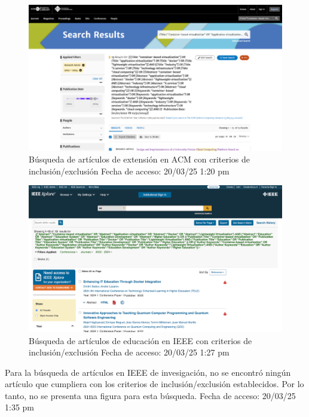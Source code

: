\begin{figure}[htbp]
    \centering
    \includegraphics[width=\textwidth,keepaspectratio]{apendices/BD/criterios/ACM-ind.png}
    \caption{Búsqueda de artículos de extensión en ACM con criterios de inclusión/exclusión
    Fecha de acceso: 20/03/25 1:20 pm
    }\label{fig:busqueda18}
\end{figure}
\FloatBarrier
\begin{figure}[htbp]
    \centering
    \includegraphics[width=\textwidth,keepaspectratio]{apendices/BD/criterios/IEEE-ed.png}
    \caption{Búsqueda de artículos de educación en IEEE con criterios de inclusión/exclusión
    Fecha de acceso: 20/03/25 1:27 pm
    }\label{fig:busqueda19}
\end{figure}
\FloatBarrier
Para la búsqueda de artículos en IEEE de invesigación, no se encontró ningún artículo que cumpliera con los criterios de inclusión/exclusión establecidos. Por lo tanto, no se presenta una figura para esta búsqueda.
Fecha de acceso: 20/03/25 1:35 pm
